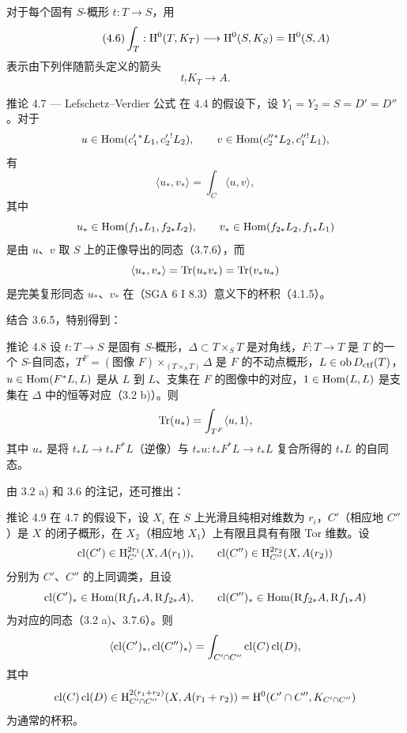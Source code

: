 对于每个固有 $S$-概形 $t:T\longrightarrow S$，用
\begin{equation}
\tag{4.6}
\int_T:\mathrm{H}^0(T,K_T)\longrightarrow \mathrm{H}^0(S,K_S)=\mathrm{H}^0(S,A)
\end{equation}
表示由下列伴随箭头定义的箭头
\[
t_!K_T\longrightarrow A.
\]

\begin{statement}{推论 4.7 --- Lefschetz--Verdier 公式}
在 4.4 的假设下，设 $Y_1=Y_2=S=D'=D''$。对于
\[
u\in\operatorname{Hom}(c_1'{}^*L_1,c_2'{}^!L_2),\qquad
v\in\operatorname{Hom}(c_2''{}^*L_2,c_1''{}^!L_1),
\]
有
\begin{equation}
\tag{4.7.1}
\langle u_*,v_*\rangle=\int_C\langle u,v\rangle,
\end{equation}
其中
\[
u_*\in\operatorname{Hom}(f_{1*}L_1,f_{2*}L_2),\qquad
v_*\in\operatorname{Hom}(f_{2*}L_2,f_{1*}L_1)
\]
是由 $u$、$v$ 取 $S$ 上的正像导出的同态（3.7.6），而
\[
\langle u_*,v_*\rangle=\operatorname{Tr}(u_*v_*)=\operatorname{Tr}(v_*u_*)
\]
是完美复形同态 $u_*$、$v_*$ 在（SGA 6 I 8.3）意义下的杯积（4.1.5）。
\end{statement}

结合 3.6.5，特别得到：

\begin{statement}{推论 4.8}
设 $t:T\longrightarrow S$ 是固有 $S$-概形，$\Delta\subset T\times_S T$ 是对角线，$F:T\longrightarrow T$ 是 $T$ 的一个 $S$-自同态，$T^F=(\text{图像 }F)\times_{(T\times_S T)}\Delta$ 是 $F$ 的不动点概形，$L\in\operatorname{ob}D_{\mathrm{ctf}}(T)$，$u\in\operatorname{Hom}(F^*L,L)$ 是从 $L$ 到 $L$、支集在 $F$ 的图像中的对应，$1\in\operatorname{Hom}(L,L)$ 是支集在 $\Delta$ 中的恒等对应（3.2 b)）。则
\[
\operatorname{Tr}(u_*)=\int_{T^F}\langle u,1\rangle,
\]
其中 $u_*$ 是将 $t_*L\longrightarrow t_*F^*L$（逆像）与 $t_*u:t_*F^*L\longrightarrow t_*L$ 复合所得的 $t_*L$ 的自同态。
\end{statement}

由 3.2 a) 和 3.6 的注记，还可推出：

\begin{statement}{推论 4.9}
在 4.7 的假设下，设 $X_i$ 在 $S$ 上光滑且纯相对维数为 $r_i$，$C'$（相应地 $C''$）是 $X$ 的闭子概形，在 $X_2$（相应地 $X_1$）上有限且具有有限 Tor 维数。设
\[
\operatorname{cl}(C')\in \mathrm{H}_{C'}^{2r_1}(X,A(r_1)),\qquad
\operatorname{cl}(C'')\in \mathrm{H}_{C''}^{2r_2}(X,A(r_2))
\]
分别为 $C'$、$C''$ 的上同调类，且设
\[
\operatorname{cl}(C')_*\in\operatorname{Hom}(\mathrm R f_{1*}A,\mathrm R f_{2*}A),\qquad
\operatorname{cl}(C'')_*\in\operatorname{Hom}(\mathrm R f_{2*}A,\mathrm R f_{1*}A)
\]
为对应的同态（3.2 a)、3.7.6）。则
\[
\langle \operatorname{cl}(C')_*,\operatorname{cl}(C'')_*\rangle
=
\int_{C'\cap C''}\operatorname{cl}(C)\operatorname{cl}(D),
\]
其中
\[
\operatorname{cl}(C)\operatorname{cl}(D)\in
\mathrm{H}_{C'\cap C''}^{2(r_1+r_2)}(X,A(r_1+r_2))
=
\mathrm{H}^0(C'\cap C'',K_{C'\cap C''})
\]
为通常的杯积。
\end{statement}

